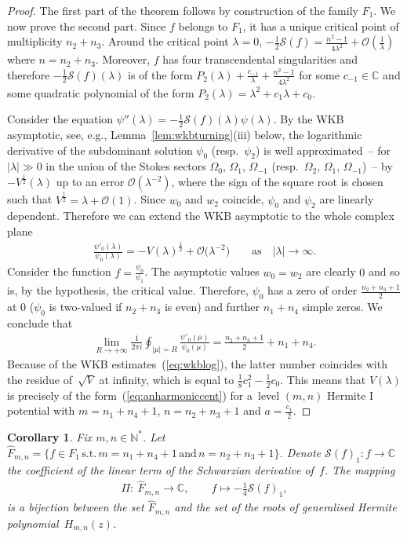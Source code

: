 \documentclass[pdftex]{sigma}
\numberwithin{equation}{section}
\newtheorem{cor}[thm]{Corollary}
\newcommand{\bb}[1]{\mathbb{ #1 }}
\newcommand{\la}{\lambda}
\begin{document}
\begin{proof}
The f\/irst part of the theorem follows by construction of the family $F_1$. We now prove the second part. Since $f$ belongs to $F_1$, it has a unique critical point of multiplicity $n_2+n_3$. Around the critical point $\la=0$, $-\frac12 \mathcal{S}(f)= \frac{n^2-1}{4\la^2}+\mathcal{O}(\frac{1}{\la})$ where $n=n_2+n_3$. Moreover, $f$ has four transcendental singularities and therefore $-\frac12 \mathcal{S}(f)(\la)$ is of the form $P_2(\la)+\frac{c_{-1}}{\la}+\frac{n^2-1}{4\la^2}$ for some $c_{-1} \in \bb{C}$ and some quadratic polynomial of the form $P_2(\la)=\la^2+c_1 \la+c_0$.

Consider the equation $\psi''(\la)=-\frac12 \mathcal{S}(f)(\la) \psi(\la)$. By the WKB asymptotic, see, e.g., Lem\-ma~\ref{lem:wkbturning}(iii) below, the logarithmic derivative of the subdominant solution $\psi_0$ (resp.\ $\psi_2$) is well approximated~-- for $|\la|\gg0$ in the union of the Stokes sectors $\Omega_0$, $\Omega_1$, $\Omega_{-1}$ (resp.\ $\Omega_2$, $\Omega_1$, $\Omega_{-1}$)~-- by $-V^{\frac12}(\la)$ up to an error $\mathcal{O}(\la^{-2})$, where the sign of the square root is chosen such that $V^{\frac12}=\la + \mathcal{O}(1)$. Since $w_0$ and $w_2$ coincide, $\psi_0$ and $\psi_2$ are linearly dependent. Therefore we can extend the WKB asymptotic to the whole complex plane
 \begin{gather}\label{eq:wkblog}
 \frac{\psi'_0(\la)}{\psi_0(\la)}=-V(\la)^{\frac12}+\mathcal{O}\big(\la^{-2}\big) \qquad \mbox{as} \quad |\la| \to \infty .
 \end{gather}
Consider the function $f=\frac{\psi_0}{\psi_1}$. The asymptotic values $w_0=w_2$ are clearly $0$ and so is, by the hypothesis, the critical value. Therefore, $\psi_0$ has a zero of order $\frac{n_2+n_3+1}2$ at $0$ ($\psi_0$ is two-valued if $n_2+n_3$ is even) and further $n_1+n_4$ simple zeros. We conclude that
\begin{gather*}
\lim_{R \to +\infty}\frac{1}{2 \pi i}\oint_{|\mu|=R}\frac{\psi'_0(\mu)}{\psi_0(\mu)}=\frac{n_2+n_3+1}2+n_1+n_4.
\end{gather*}
Because of the WKB estimates~(\ref{eq:wkblog}), the latter number coincides with the residue of~$\sqrt{V}$ at inf\/inity, which is equal to $\frac18 c_1^2-\frac12 c_0$. This means that $V(\la)$ is precisely of the form~(\ref{eq:anharmoniccent}) for a~level $(m,n)$ Hermite I potential with $m=n_1+n_4+1$, $n=n_2+n_3+1$ and $a=\frac{c_1}{2}$.
\end{proof}

\begin{cor}Fix $m,n\in\mathbb{N}^*$. Let $\widehat{F}_{m,n}=\lbrace f \in F_1 \, \text{s.t.}\, m=n_1+n_4+1 \,\text{and}\, n=n_2+n_3+1 \rbrace$.
Denote $\mathcal{S}(f)_1\colon f \to \bb{C}$ the coefficient of the linear term of the Schwarzian derivative of~$f$.
The mapping \begin{gather*}
 \Pi\colon \ \widehat{F}_{m,n} \to \bb{C},\qquad f \mapsto -\frac14\mathcal{S}(f)_1,
 \end{gather*}
is a bijection between the set $\widehat{F}_{m,n}$ and the set of the roots of generalised Hermite polyno\-mial~$H_{m,n}(z)$.
\end{cor}
\end{document}
